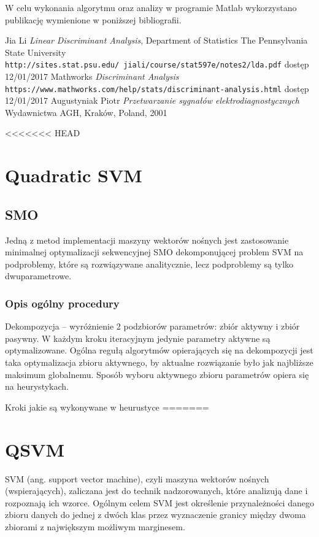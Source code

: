 \documentclass[[10pt,a4paper]{article}
\begin{document}
W celu wykonania algorytmu oraz analizy w programie Matlab wykorzystano publikację wymienione w poniższej bibliografii.

\begin{thebibliography}{9}
Jia Li
\textit{Linear Discriminant Analysis}, Department of Statistics
The Pennsylvania State University
\\\texttt {http://sites.stat.psu.edu/~jiali/course/stat597e/notes2/lda.pdf}
dostęp 12/01/2017
Mathworks
\textit{Discriminant Analysis}
\\\texttt {https://www.mathworks.com/help/stats/discriminant-analysis.html}
dostęp 12/01/2017
Augustyniak Piotr
\textit{Przetwarzanie sygnałów elektrodiagnostycznych} 
Wydawnictwa AGH, Kraków, Poland, 2001

\end{thebibliography}

\newpage
<<<<<<< HEAD
\section{Quadratic SVM}
\subsection{SMO}
Jedną z metod implementacji maszyny wektorów nośnych jest zastosowanie minimalnej optymalizacji sekwencyjnej SMO dekomponującej problem SVM na podproblemy, które są rozwiązywane analitycznie, lecz podproblemy są tylko dwuparametrowe.
\subsubsection{Opis ogólny procedury}
Dekompozycja – wyróżnienie 2 podzbiorów parametrów: zbiór aktywny i zbiór pasywny. W każdym kroku iteracyjnym jedynie parametry aktywne są optymalizowane. Ogólna regułą algorytmów opierających się na dekompozycji jest taka optymalizacja zbioru aktywnego, by aktualne rozwiązanie było jak najbliższe maksimum globalnemu. 
Sposób wyboru aktywnego zbioru parametrów opiera się na heurystykach.

Kroki jakie są wykonywane w heurustyce
=======
\section{QSVM}
SVM (ang. support vector machine), czyli maszyna wektorów nośnych
(wspierających), zaliczana jest do technik nadzorowanych, które analizują dane i rozpoznają
ich wzorce. Ogólnym celem SVM jest określenie przynależności danego zbioru danych do
jednej z dwóch klas przez wyznaczenie granicy między dwoma zbiorami z największym
możliwym marginesem.
\end{document}
